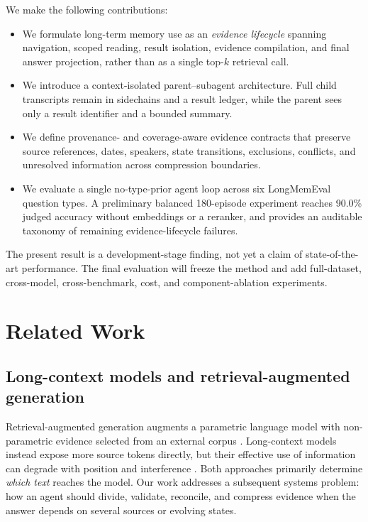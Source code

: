 \documentclass{article}
\begin{document}
We make the following contributions:
\begin{itemize}
    \item We formulate long-term memory use as an \emph{evidence lifecycle}
    spanning navigation, scoped reading, result isolation, evidence compilation,
    and final answer projection, rather than as a single top-$k$ retrieval call.
    \item We introduce a context-isolated parent--subagent architecture. Full
    child transcripts remain in sidechains and a result ledger, while the parent
    sees only a result identifier and a bounded summary.
    \item We define provenance- and coverage-aware evidence contracts that
    preserve source references, dates, speakers, state transitions, exclusions,
    conflicts, and unresolved information across compression boundaries.
    \item We evaluate a single no-type-prior agent loop across six LongMemEval
    question types. A preliminary balanced 180-episode experiment reaches
    90.0\% judged accuracy without embeddings or a reranker, and provides an
    auditable taxonomy of remaining evidence-lifecycle failures.
\end{itemize}

The present result is a development-stage finding, not yet a claim of
state-of-the-art performance. The final evaluation will freeze the method and
add full-dataset, cross-model, cross-benchmark, cost, and component-ablation
experiments.

\section{Related Work}

\subsection{Long-context models and retrieval-augmented generation}

Retrieval-augmented generation augments a parametric language model with
non-parametric evidence selected from an external corpus
\citep{lewis2020rag}. Long-context models instead expose more source tokens
directly, but their effective use of information can degrade with position and
interference \citep{liu2024lost}. Both approaches primarily determine
\emph{which text} reaches the model. Our work addresses a subsequent systems
problem: how an agent should divide, validate, reconcile, and compress evidence
when the answer depends on several sources or evolving states.
\end{document}
